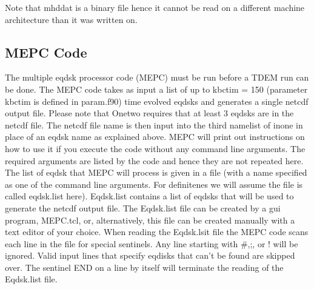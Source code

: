 Note that mhddat is a binary file hence it cannot be read  on
a different machine architecture than it was written on.

\subsection{MEPC Code}

The multiple eqdsk processor code (MEPC)  must be run  before a \ot TDEM run can
be done. The MEPC code takes as input a list of up to kbctim = 150 (parameter
kbctim is defined in param.f90) time evolved eqdsks and generates a single
netcdf output file. Please note that Onetwo requires that at least 3 eqdsks are
in the netcdf file.  The  netcdf file name  is then input into the third
namelist of inone in place of an eqdsk name as explained above. MEPC will print
out instructions on how to use it if you execute the code without any command
line arguments. The required arguments are listed by the code and hence they are
not repeated here. The list of eqdsk that MEPC will process is given in a file
(with a name specified as one of the command line arguments. For definitenes we
will assume the file is called eqdsk.list here). Eqdsk.list contains a list of
eqdsks that will be used to generate the netcdf output file. The Eqdsk.list file
can be created  by a gui program, MEPC.tcl,  or, alternatively, this file can be
created manually with a text editor of your choice. When reading the Eqdsk.lsit
file the MEPC code scans each line in the file for special sentinels. Any line
starting with \#,;, or ! will be ignored. Valid input lines that specify eqdisks
that can't be found are skipped over. The sentinel  END on a line by itself will
terminate the reading of the Eqdsk.list file. %
